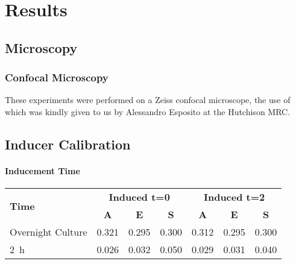 \documentclass[../main.tex]{subfiles}
\begin{document}
\section{Results}

\subsection{Microscopy}

\subsubsection{Confocal Microscopy}

These experiments were performed on a Zeiss confocal microscope, the use of which was kindly given to us by Alessandro Esposito at the Hutchison MRC.




\subsection{Inducer Calibration}

\paragraph{Inducement Time}

\begin{table}[h!]
\begin{center}
\begin{tabular}{l|c|c|c|c|c|c}
\multirow{2}{*}{\textbf{Time}} &	\multicolumn{3}{c|}{\textbf{Induced t=0}}  &	\multicolumn{3}{c}{\textbf{Induced t=2}}	\\
& \textbf{A} & \textbf{E} & \textbf{S} & \textbf{A} & \textbf{E} & \textbf{S} \\\hline
Overnight Culture & 0.321 & 0.295 & 0.300 & 0.312 & 0.295 & 0.300\\
\SI{2}{\hour} & 0.026 & 0.032 & 0.050 & 0.029 & 0.031 & 0.040
\end{tabular}
\end{center}
\end{table}
\end{document}
